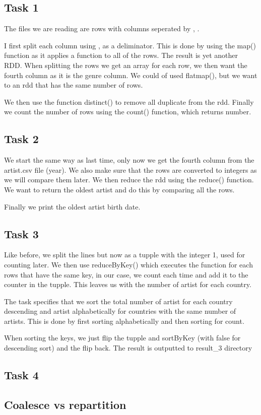 \documentclass[12pt]{article}
\begin{document}
\subsection{Task 1}

The files we are reading are rows with columns seperated by , .

I first split each column using , as a deliminator. This is done by using the map() function as it applies a function to all of the rows. The result is yet another RDD. When splitting the rows we get an array for each row, we then want the fourth column as it is the genre column. We could of used flatmap(), but we want to an rdd that has the same number of rows.

We then use the function distinct() to remove all duplicate from the rdd. Finally we count the number of rows using the count() function, which returns  number.


\subsection{Task 2}

We start the same way as last time, only now we get the fourth column from the artist.csv file (year). We also make sure that the rows are converted to integers as we will compare them later. We then reduce the rdd using the reduce() function. We want to return the oldest artist and do this by comparing all the rows.

Finally we print the oldest artist birth date.

\subsection{Task 3}

Like before, we split the lines but now as a tupple with the integer 1, used for counting later. We then use reduceByKey() which executes the function for each rows that have the same key, in our case, we count each time and add it to the counter in the tupple. This leaves us with the number of artist for each country.

The task specifies that we sort the total number of artist for each country descending and artist alphabetically for countries with the same number of artists. This is done by first sorting alphabetically and then sorting for count.

When sorting the keys, we just flip the tupple and sortByKey (with false for descending sort) and the flip back. The result is outputted to result_3 directory

\subsection{Task 4}



\subsection{Coalesce vs repartition}
\end{document}
